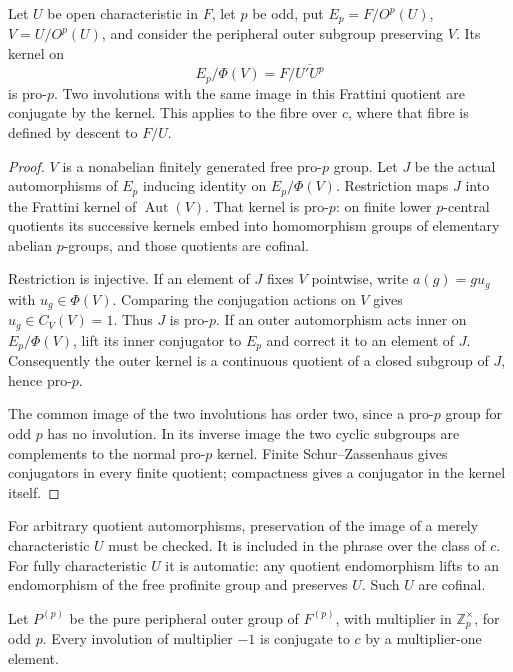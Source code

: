Let \(U\) be open characteristic in \(F\), let \(p\)
be odd, put \(E_p=F/O^p(U)\), \(V=U/O^p(U)\),
and consider the peripheral outer subgroup preserving
\(V\). Its kernel on
\[
           E_p/\Phi(V)=F/\overline{U'U^p}
\]
is pro-\(p\). Two involutions with the same image
in this Frattini quotient are conjugate by the kernel.
This applies to the fibre over \(c\), where that
fibre is defined by descent to \(F/U\).

\begin{proof}
\(V\) is a nonabelian finitely generated free
pro-\(p\) group. Let \(J\) be the actual
automorphisms of \(E_p\) inducing identity on
\(E_p/\Phi(V)\). Restriction maps \(J\) into
the Frattini kernel of \(\operatorname{Aut}(V)\).
That kernel is pro-\(p\): on finite lower
\(p\)-central quotients its successive kernels
embed into homomorphism groups of elementary
abelian \(p\)-groups, and those quotients are cofinal.

Restriction is injective. If an element of \(J\)
fixes \(V\) pointwise, write \(a(g)=gu_g\) with
\(u_g\in\Phi(V)\). Comparing the conjugation
actions on \(V\) gives \(u_g\in C_V(V)=1\).
Thus \(J\) is pro-\(p\). If an outer automorphism
acts inner on \(E_p/\Phi(V)\), lift its inner
conjugator to \(E_p\) and correct it to an
element of \(J\). Consequently the outer
kernel is a continuous quotient of a closed
subgroup of \(J\), hence pro-\(p\).

The common image of the two involutions has
order two, since a pro-\(p\) group for odd \(p\)
has no involution. In its inverse image the
two cyclic subgroups are complements to the
normal pro-\(p\) kernel. Finite
Schur--Zassenhaus gives conjugators in every
finite quotient; compactness gives a conjugator
in the kernel itself.
\end{proof}

For arbitrary quotient automorphisms, preservation
of the image of a merely characteristic \(U\)
must be checked. It is included in the phrase
over the class of \(c\). For fully characteristic
\(U\) it is automatic: any quotient endomorphism
lifts to an endomorphism of the free profinite
group and preserves \(U\). Such \(U\) are cofinal.

Let \(P^{(p)}\) be the pure peripheral outer group
of \(F^{(p)}\), with multiplier in
\(\mathbb Z_p^\times\), for odd \(p\).
Every involution of multiplier \(-1\) is
conjugate to \(c\) by a multiplier-one element.

